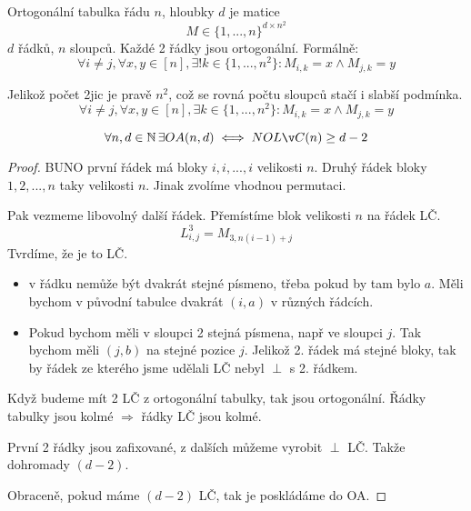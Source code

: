 \begin{definition}
	Ortogonální tabulka řádu $n$, hloubky $d$ je matice
	\[ M \in \{ 1, ..., n \}^{d \times n^2} \]
	$d$ řádků, $n$ sloupců.
	Každé 2 řádky jsou ortogonální. Formálně:
	\[ \forall i \neq j, \forall x,y \in [n], \exists !k \in \{ 1, ..., n^2 \}: M_{i, k} = x \land M_{j, k} = y \]
\end{definition}

\begin{note}
	Jelikož počet 2jic je pravě $n^2$, což se rovná počtu sloupců stačí i slabší podmínka.
	\[ \forall i \neq j, \forall x,y \in [n], \exists k \in \{ 1, ..., n^2 \}: M_{i, k} = x \land M_{j, k} = y \]
\end{note}
\begin{theorem}\label{nolc_oa}
	\[ \forall n,d \in \N \exists OA(n, d) \iff NOLČ(n) \geq d - 2 \]
\end{theorem}
\begin{proof}
	BUNO první řádek má bloky $i, i, ..., i$ velikosti $n$.
	Druhý řádek bloky $1, 2, ..., n$ taky velikosti $n$.
	Jinak zvolíme vhodnou permutaci.

	Pak vezmeme libovolný další řádek. Přemístíme blok velikosti $n$ na řádek LČ.
	\[ L^3_{i, j} = M_{3, n (i - 1) + j} \]
	Tvrdíme, že je to LČ.
	\begin{itemize}
		\item v řádku nemůže být dvakrát stejné písmeno, třeba pokud by tam bylo $a$.
			Měli bychom v původní tabulce dvakrát $(i, a)$ v různých řádcích.
		\item Pokud bychom měli v sloupci 2 stejná písmena, např ve sloupci $j$.
			Tak bychom měli $(j, b)$ na stejné pozice $j$.
			Jelikož 2. řádek má stejné bloky, tak by řádek ze kterého jsme udělali LČ nebyl $\perp$ s 2. řádkem.
	\end{itemize}

	Když budeme mít 2 LČ z ortogonální tabulky, tak jsou ortogonální.
	Řádky tabulky jsou kolmé $\Rightarrow$ řádky LČ jsou kolmé.

	První 2 řádky jsou zafixované, z dalších můžeme vyrobit $\perp$ LČ.
	Takže dohromady $(d - 2)$.

	Obraceně, pokud máme $(d - 2)$ LČ, tak je poskládáme do OA.
\end{proof}


